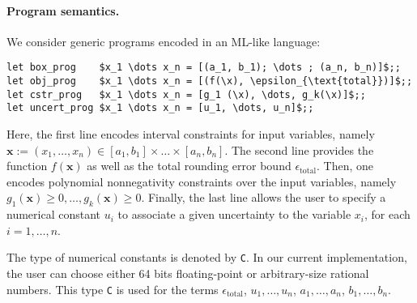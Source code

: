\documentclass[preprint]{sigplanconf}
\newcommand{\code}[1]{\lstinline{#1}}
\newcommand{\x}{\mathbf{x}}
\theoremstyle{plain}
\begin{document}
\paragraph{Program semantics.}
%
We consider generic programs encoded in an ML-like language:
\begin{lstlisting}
let box_prog    $x_1 \dots x_n = [(a_1, b_1); \dots ; (a_n, b_n)]$;;
let obj_prog    $x_1 \dots x_n = [(f(\x), \epsilon_{\text{total}})]$;;
let cstr_prog   $x_1 \dots x_n = [g_1 (\x), \dots, g_k(\x)]$;;
let uncert_prog $x_1 \dots x_n = [u_1, \dots, u_n]$;;
\end{lstlisting}
Here, the first line encodes interval constraints for input variables, namely $\x := (x_1, \dots, x_n) \in [a_1, b_1]\times \dots \times [a_n, b_n]$.
The second line provides the function $f(\x)$ as well as the total rounding error bound $\epsilon_{\text{total}}$.
Then, one encodes polynomial nonnegativity constraints over the input variables, namely $g_1(\x) \geq 0, \dots, g_k(\x) \geq 0$. Finally, the last line allows the user to specify a numerical constant $u_i$ to associate a given uncertainty to the variable $x_i$, for each $i= 1, \dots, n$.

The type of numerical constants is denoted by \code{C}. In our current implementation, the user can choose either 64 bits floating-point or arbitrary-size rational numbers. This type \code{C} is used for the terms $\epsilon_{\text{total}}$, $u_1, \dots, u_n$, $a_1, \dots, a_n$, $b_1, \dots, b_n$.
\end{document}
